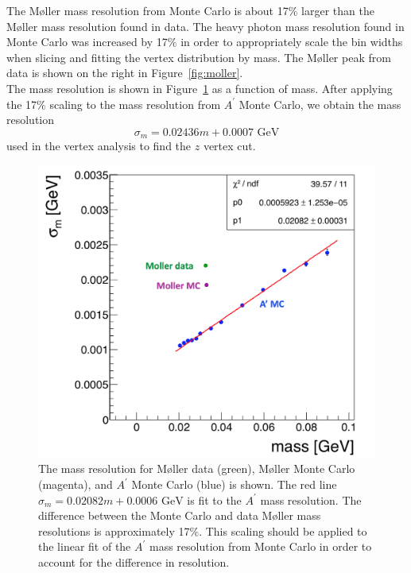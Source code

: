The M\o ller mass resolution from Monte Carlo is about 17$\%$ larger than the M\o ller mass resolution found in data. The heavy photon mass resolution found in Monte Carlo was increased by 17$\%$ in order to appropriately scale the bin widths when slicing and fitting the vertex distribution by mass. The M\o ller peak from data is shown on the right in Figure~\ref{fig:moller}. \\
\indent The mass resolution is shown in Figure~\ref{fig:massRes} as a function of mass. After applying the 17$\%$ scaling to the mass resolution from $A^{\prime}$ Monte Carlo, we obtain the mass resolution
\begin{equation}
\label{eq:massresScaled}
\sigma_m = 0.02436m+0.0007 \textrm{ GeV}
\end{equation}
used in the vertex analysis to find the $z$ vertex cut. 

\begin{figure}[hbt]
\begin{minipage}{0.65\textwidth}
\includegraphics[width=\textwidth]{pics/searching/massResolution.png}
\end{minipage}\hfill\begin{minipage}{0.32\textwidth}
\caption[Mass resolution compared between Monte Carlo and data]{ \label{fig:massRes} \baselineskip 11pt
The mass resolution for M\o ller data (green), M\o ller Monte Carlo (magenta), and $A^{\prime}$ Monte Carlo (blue) is shown. The red line $\sigma_m = 0.02082m+0.0006\textrm{ GeV}$ is fit to the $A^{\prime}$ mass resolution. The difference between the Monte Carlo and data M\o ller mass resolutions is approximately 17$\%$. This scaling should be applied to the linear fit of the $A^{\prime}$ mass resolution from Monte Carlo in order to account for the difference in resolution.
}
\end{minipage}
\end{figure}

